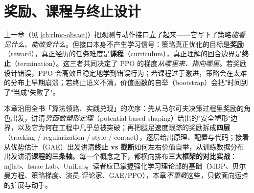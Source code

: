 \chapter{奖励、课程与终止设计}\label{ch:rlmc-reward}


上一章（见 \cref{ch:rlmc-obsact}）把观测与动作接口立了起来——它写下了策略\emph{能看见什么}、\emph{能改变什么}。但接口本身不产生学习信号：策略真正优化的目标是\textbf{奖励}（reward），真正经历的任务难度是\textbf{课程}（curriculum），真正理解的回合边界是\textbf{终止}（termination）。这三者共同决定了 PPO 的梯度\emph{从哪里来、指向哪里}。若奖励设计错误，PPO 会高效且稳定地学到错误行为；若课程过于激进，策略会在太难的分布上早期崩溃；若终止语义不清，价值函数的自举（bootstrap）会把"时间到了"当成"失败了"。

本章沿用全书「算法领路、实践兑现」的次序：先从马尔可夫决策过程里奖励的角色出发，讲清\emph{势函数塑形定理}（potential-based shaping）给出的"安全塑形"边界，以及它为何在工程中几乎总被突破；再把腿足速度跟踪的奖励拆成\textbf{四层}（tracking / regularization / style / contact），逐层给出原理、配置与代码；接着从优势估计（GAE）出发讲清\textbf{终止 vs 截断}如何左右价值自举，从训练数据分布出发讲清\textbf{课程的三条轴}。每一个概念之下，都横向排布\textbf{三大框架的对比实战}：mjlab、Isaac Lab、UniLab。读者应已掌握强化学习理论部的基础（MDP、贝尔曼方程、策略梯度、演员-评论家、GAE/PPO），本章\emph{不重教}这些，只做面向运控的扩展与动手。

